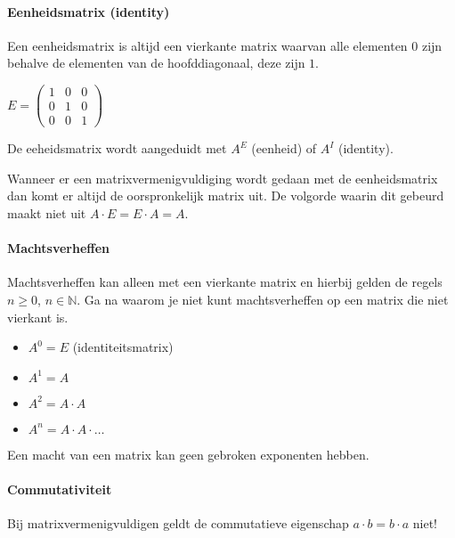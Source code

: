\documentclass[11pt]{article}
\providecommand{\tightlist}{%
      \setlength{\itemsep}{0pt}\setlength{\parskip}{0pt}}
\begin{document}
    \hypertarget{eenheidsmatrix-identity}{%
\paragraph{Eenheidsmatrix (identity)}\label{eenheidsmatrix-identity}}

    Een eenheidsmatrix is altijd een vierkante matrix waarvan alle elementen
\(0\) zijn behalve de elementen van de hoofddiagonaal, deze zijn \(1\).

\(E = \begin{pmatrix} 1 & 0 & 0 \\ 0 & 1 & 0 \\ 0 & 0 & 1 \end{pmatrix}\)

De eeheidsmatrix wordt aangeduidt met \(A^E\) (eenheid) of \(A^I\)
(identity).

Wanneer er een matrixvermenigvuldiging wordt gedaan met de
eenheidsmatrix dan komt er altijd de oorspronkelijk matrix uit. De
volgorde waarin dit gebeurd maakt niet uit \(A\cdot E = E \cdot A = A\).

    \hypertarget{machtsverheffen}{%
\paragraph{Machtsverheffen}\label{machtsverheffen}}

    Machtsverheffen kan alleen met een vierkante matrix en hierbij gelden de
regels \(n \geq 0\), \(n \in \mathbb{N}\). Ga na waarom je niet kunt
machtsverheffen op een matrix die niet vierkant is.

\begin{itemize}
\tightlist
\item
  \(A^0 = E\) (identiteitsmatrix)
\item
  \(A^1 = A\)
\item
  \(A^2 = A\cdot A\)
\item
  \(A^n = A \cdot A \cdot \ldots\)
\end{itemize}

Een macht van een matrix kan geen gebroken exponenten hebben.

    \hypertarget{commutativiteit}{%
\paragraph{Commutativiteit}\label{commutativiteit}}

    Bij matrixvermenigvuldigen geldt de commutatieve eigenschap
\(a \cdot b = b \cdot a\) niet!
\end{document}
